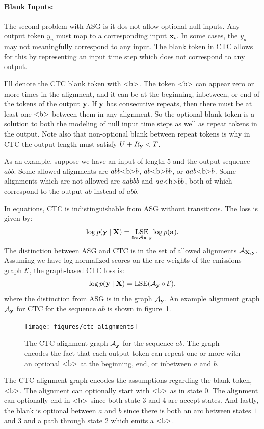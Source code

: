 \paragraph{Blank Inputs:} The second problem with ASG is it dos not allow
optional null inputs. Any output token $y_u$ must map to a corresponding input
${\bf x}_t$. In some cases, the $y_u$ may not meaningfully correspond to any input.
The blank token in CTC allows for this by representing an input time step which
does not correspond to any output.

I'll denote the CTC blank token with $\textrm{<b>}$. The token $\textrm{<b>}$ can appear
zero or more times in the alignment, and it can be at the beginning, inbetween,
or end of the tokens of the output ${\bf y}$. If ${\bf y}$ has consecutive repeats,
then there must be at least one $\textrm{<b>}$ between them in any alignment. So the
optional blank token is a solution to both the modeling of null input time
steps as well as repeat tokens in the output. Note also that non-optional blank
between repeat tokens is why in CTC the output length must satisfy $U + R_{\bf y} <
T$.

As an example, suppose we have an input of length $5$ and the output sequence
$abb$. Some allowed alignments are $abb \textrm{<b>} b$, $ab \textrm{<b>} bb$, or $aa b
\textrm{<b>} b$. Some alignments which are not allowed are $aabbb$ and $aa\textrm{<b>} b
b$, both of which correspond to the output $ab$ instead of $abb$.

In equations, CTC is indistinguishable from ASG without transitions. The loss
is given by:
$$
\log p({\bf y} \mid {\bf X}) = \operatorname*{\textrm{LSE}}_{{\bf a} \in \mathcal{A}_{{\bf X}, {\bf y}}} \log p({\bf a}).
$$
The distinction between ASG and CTC is in the set of allowed alignments
$\mathcal{A}_{{\bf X}, {\bf y}}$. Assuming we have log normalized scores on the arc weights of
the emissions graph $\mathcal{E}$, the graph-based CTC loss is:
$$
\log p({\bf y} \mid {\bf X}) = \operatorname*{\textrm{LSE}}(\mathcal{A}_{\bf y} \circ \mathcal{E}),
$$
where the distinction from ASG is in the graph $\mathcal{A}_{\bf y}$. An example alignment
graph $\mathcal{A}_{\bf y}$ for CTC for the sequence $ab$ is shown in
figure~\ref{fig:ctc_alignments}.

\begin{figure}
    \centering
    \texttt{[image: figures/ctc\_alignments]}
    \caption{The CTC alignment graph $\mathcal{A}_{\bf y}$ for the sequence $ab$. The graph
    encodes the fact that each output token can repeat one or more with an
    optional $\textrm{<b>}$ at the beginning, end, or inbetween $a$ and $b$.}
    \label{fig:ctc_alignments}
\end{figure}

The CTC alignment graph encodes the assumptions regarding the blank
token, $\textrm{<b>}$. The alignment can optionally start with $\textrm{<b>}$ as in state
$0$. The alignment can optionally end in $\textrm{<b>}$ since both state $3$ and $4$
are accept states. And lastly, the blank is optional between $a$ and $b$ since
there is both an arc between states $1$ and $3$ and a path through state $2$
which emits a $\textrm{<b>}$.

